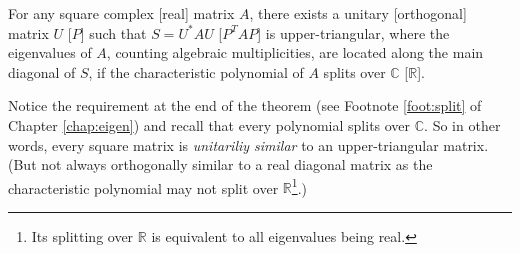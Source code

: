 \begin{thm}
\label{thm:schurtrig}
For any square complex [real] matrix $A$, there exists a unitary [orthogonal] matrix $U$ [$P$] such that $S = U^*AU$ [$P^TAP$] is upper-triangular, where the eigenvalues of $A$, counting algebraic multiplicities, are located along the main diagonal of $S$, if the characteristic polynomial of $A$ splits over $\mathbb{C}$ [$\mathbb{R}$].
\end{thm}
Notice the requirement at the end of the theorem (see Footnote \ref{foot:split} of Chapter \ref{chap:eigen}) and recall that every polynomial splits over $\mathbb{C}$. So in other words, every square matrix is \textit{unitariliy similar} to an upper-triangular matrix. (But not always orthogonally similar to a real diagonal matrix as the characteristic polynomial may not split over $\mathbb{R}$\footnote{Its splitting over $\mathbb{R}$ is equivalent to all eigenvalues being real.}.)
